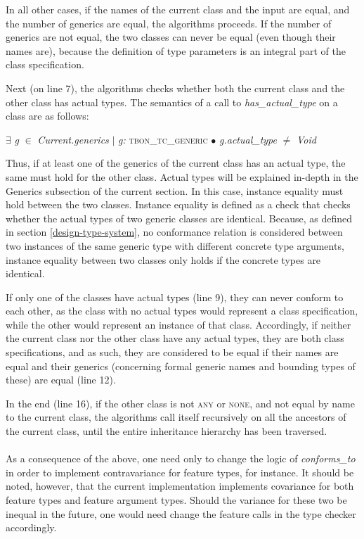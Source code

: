 In all other cases, if the names of the current class and the input are equal, and the number of generics are equal, the algorithms proceeds. If the number of generics are not equal, the two classes can never be equal (even though their names are), because the definition of type parameters is an integral part of the class specification.

Next (on line 7), the algorithms checks whether both the current class and the other class has actual types. The semantics of a call to \textit{has\_actual\_type} on a class are as follows:

{\footnotesize
\begin{center} 
$\exists$ \textit{g} $\in$ \textit{Current.generics} $\mid$ \textit{g:} \textsc{tbon\_tc\_generic} $\bullet$ \textit{g.actual\_type} $\neq$ \textit{Void}
\end{center}}

Thus, if at least one of the generics of the current class has an actual type, the same must hold for the other class. Actual types will be explained in-depth in the Generics subsection of the current section. In this case, instance equality must hold between the two classes. Instance equality is defined as a check that checks whether the actual types of two generic classes are identical. Because, as defined in section \ref{design-type-system}, no conformance relation is considered between two instances of the same generic type with different concrete type arguments, instance equality between two classes only holds if the concrete types are identical.

If only one of the classes have actual types (line 9), they can never conform to each other, as the class with no actual types would represent a class specification, while the other would represent an instance of that class. Accordingly, if neither the current class nor the other class have any actual types, they are both class specifications, and as such, they are considered to be equal if their names are equal and their generics (concerning formal generic names and bounding types of these) are equal (line 12).

In the end (line 16), if the other class is not \textsc{any} or \textsc{none}, and not equal by name to the current class, the algorithms call itself recursively on all the ancestors of the current class, until the entire inheritance hierarchy has been traversed. 
\paragraph{}
As a consequence of the above, one need only to change the logic of \textit{conforms\_to} in order to implement contravariance for feature types, for instance. It should be noted, however, that the current implementation implements covariance for both feature types and feature argument types. Should the variance for these two be inequal in the future, one would need change the feature calls in the type checker accordingly.

